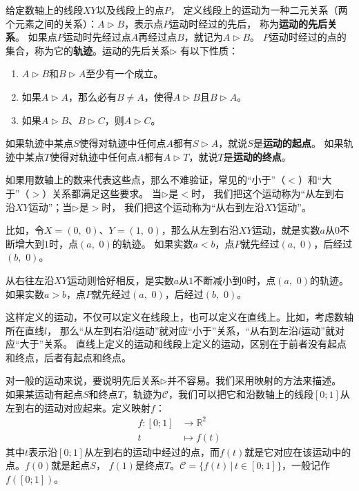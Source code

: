 \documentclass[12pt,UTF8]{ctexbook}
\begin{document}
给定数轴上的线段$XY$以及线段上的点$P$，
定义线段上的运动为一种二元关系（两个元素之间的关系）：$A \triangleright B$，表示点$P$运动时经过的先后，
称为\textbf{运动的先后关系}。
如果点$P$运动时先经过点$A$再经过点$B$，就记为$A \triangleright B$。
$P$运动时经过的点的集合，称为它的\textbf{轨迹}。运动的先后关系$\triangleright$
有以下性质：
\begin{enumerate}
    \item $A \triangleright B$和$B \triangleright A$至少有一个成立。
    \item 如果$A \triangleright A$，那么必有$B\neq A$，使得$A \triangleright B$且$B \triangleright A$。
    \item 如果$A \triangleright B$、$B \triangleright C$，则$A \triangleright C$。
\end{enumerate}
如果轨迹中某点$S$使得对轨迹中任何点$A$都有$S \triangleright A$，就说$S$是\textbf{运动的起点}。
如果轨迹中某点$T$使得对轨迹中任何点$A$都有$A \triangleright T$，就说$T$是\textbf{运动的终点}。

如果用数轴上的数来代表这些点，那么不难验证，常见的“小于”（$<$）和“大于”（$>$）关系都满足这些要求。
当$\triangleright$是$<$时，
我们把这个运动称为“从左到右沿$XY$运动”；当$\triangleright$是$>$时，
我们把这个运动称为“从右到左沿$XY$运动”。

比如，令$X = (0,\,\,0)$、$Y = (1,\,\,0)$，那么从左到右沿$XY$运动，就是实数$a$从$0$不断增大到$1$时，点$(a,\,\,0)$的轨迹。
如果实数$a<b$，点$P$就先经过$(a,\,\,0)$，后经过$(b,\,\,0)$。

从右往左沿$XY$运动则恰好相反，是实数$a$从$1$不断减小到$0$时，点$(a,\,\,0)$的轨迹。
如果实数$a>b$，点$P$就先经过$(a,\,\,0)$，后经过$(b,\,\,0)$。

这样定义的运动，不仅可以定义在线段上，也可以定义在直线上。比如，考虑数轴所在直线$l$，
那么“从左到右沿$l$运动”就对应“小于”关系，“从右到左沿$l$运动”就对应“大于”关系。
直线上定义的运动和线段上定义的运动，区别在于前者没有起点和终点，后者有起点和终点。

对一般的运动来说，要说明先后关系$\triangleright$并不容易。我们采用映射的方法来描述。
如果某运动有起点$S$和终点$T$，轨迹为$\mathcal{C}$，我们可以把它和沿数轴上的线段$[0;1]$从左到右的运动对应起来。定义映射$f$：
\begin{align*}
    f: [0;1] &\rightarrow \mathbb{R}^2  \\
         t \,\,\, &\mapsto f(t) 
\end{align*}
其中$t$表示沿$[0;1]$从左到右的运动中经过的点，而$f(t)$就是它对应在该运动中的点。$f(0)$就是起点$S$，
$f(1)$是终点$T$。$\mathcal{C} = \{f(t)\,|\,t\in[0;1]\}$，一般记作$f([0;1])$。
\end{document}

